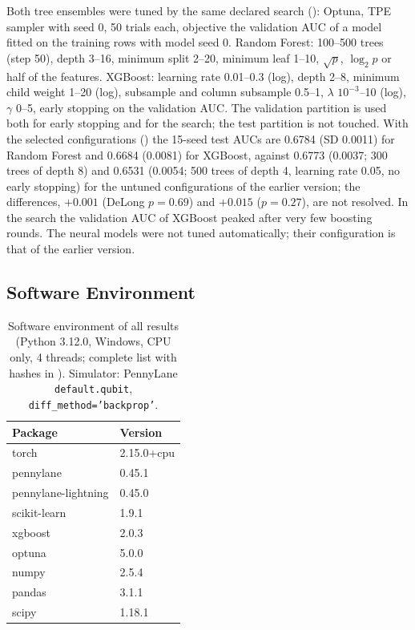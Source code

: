 \documentclass[11pt,a4paper]{article}
\begin{document}
Both tree ensembles were tuned by the same declared search (): Optuna, TPE sampler with seed 0, 50 trials each, objective the validation AUC of a model fitted on the training rows with model seed 0. Random Forest: 100--500 trees (step 50), depth 3--16, minimum split 2--20, minimum leaf 1--10, $\sqrt{p}$, $\log_2 p$ or half of the features. XGBoost: learning rate 0.01--0.3 (log), depth 2--8, minimum child weight 1--20 (log), subsample and column subsample 0.5--1, $\lambda$ $10^{-3}$--10 (log), $\gamma$ 0--5, early stopping on the validation AUC. The validation partition is used both for early stopping and for the search; the test partition is not touched. With the selected configurations () the 15-seed test AUCs are 0.6784 (SD 0.0011) for Random Forest and 0.6684 (0.0081) for XGBoost, against 0.6773 (0.0037; 300 trees of depth 8) and 0.6531 (0.0054; 500 trees of depth 4, learning rate 0.05, no early stopping) for the untuned configurations of the earlier version; the differences, $+0.001$ (DeLong $p=0.69$) and $+0.015$ ($p=0.27$), are not resolved. In the search the validation AUC of XGBoost peaked after very few boosting rounds. The neural models were not tuned automatically; their configuration is that of the earlier version.

\subsection{Software Environment}

\begin{table}[htbp]
\centering
\caption{Software environment of all results (Python 3.12.0, Windows, CPU only, 4 threads; complete list with hashes in \protect{}). Simulator: PennyLane \texttt{default.qubit}, \texttt{diff\_method='backprop'}.}
\label{tab:software_env}
{\small
\begin{tabular}{ll}
\toprule
\textbf{Package} & \textbf{Version} \\
\midrule
torch & 2.15.0+cpu \\
pennylane & 0.45.1 \\
pennylane-lightning & 0.45.0 \\
scikit-learn & 1.9.1 \\
xgboost & 2.0.3 \\
optuna & 5.0.0 \\
numpy & 2.5.4 \\
pandas & 3.1.1 \\
scipy & 1.18.1 \\
\bottomrule
\end{tabular}}
\end{table}
\end{document}
